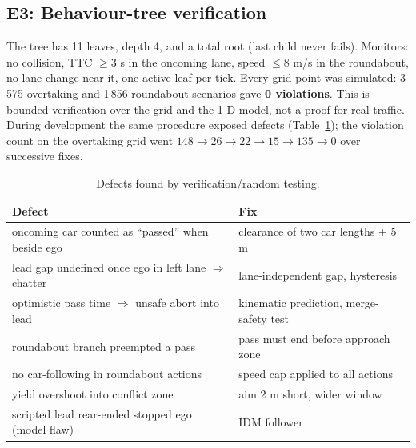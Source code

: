 \documentclass[conference]{IEEEtran}
\begin{document}
\subsection{E3: Behaviour-tree verification}
The tree has 11 leaves, depth 4, and a total root (last child never fails). Monitors: no collision, TTC $\ge3$ s in the oncoming lane, speed $\le8$ m/s in the roundabout, no lane change near it, one active leaf per tick. Every grid point was simulated: 3\,575 overtaking and 1\,856 roundabout scenarios gave \textbf{0 violations}. This is bounded verification over the grid and the 1-D model, not a proof for real traffic. During development the same procedure exposed defects (Table~\ref{tab:bugs}); the violation count on the overtaking grid went $148\to26\to22\to15\to135\to0$ over successive fixes.
\begin{table}[t]\centering\caption{Defects found by verification/random testing.}\label{tab:bugs}\small
\begin{tabular}{@{}p{3.6cm}p{4.2cm}@{}}\toprule Defect & Fix\\\midrule
oncoming car counted as ``passed'' when beside ego & clearance of two car lengths + 5 m\\
lead gap undefined once ego in left lane $\Rightarrow$ chatter & lane-independent gap, hysteresis\\
optimistic pass time $\Rightarrow$ unsafe abort into lead & kinematic prediction, merge-safety test\\
roundabout branch preempted a pass & pass must end before approach zone\\
no car-following in roundabout actions & speed cap applied to all actions\\
yield overshoot into conflict zone & aim 2 m short, wider window\\
scripted lead rear-ended stopped ego (model flaw) & IDM follower\\\bottomrule\end{tabular}\end{table}
\end{document}
